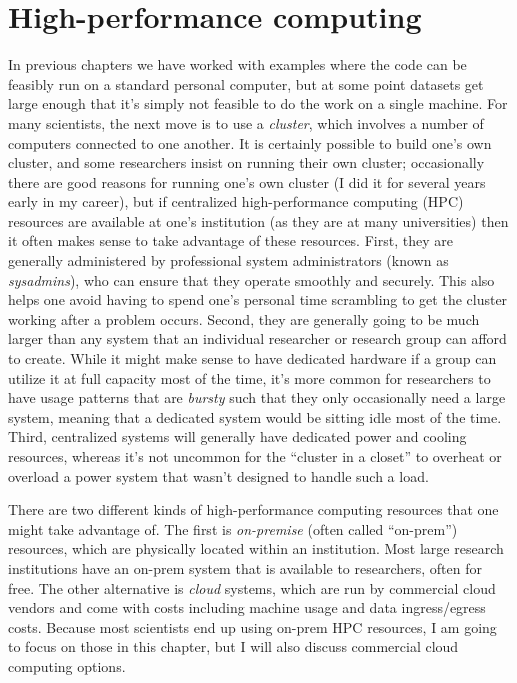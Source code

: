 \chapter{High-performance computing}

In previous chapters we have worked with examples where the code can be feasibly run on a standard personal computer, but at some point datasets get large enough that it's simply not feasible to do the work on a single machine.  For many scientists, the next move is to use a \textit{cluster}, which involves a number of computers connected to one another.  It is certainly possible to build one's own cluster, and some researchers insist on running their own cluster; occasionally there are good reasons for running one's own cluster (I did it for several years early in my career), but if centralized high-performance computing (HPC) resources are available at one's institution (as they are at many universities) then it often makes sense to take advantage of these resources. First, they are generally administered by professional system administrators (known as \textit{sysadmins}), who can ensure that they operate smoothly and securely. This also helps one avoid having to spend one's personal time scrambling to get the cluster working after a problem occurs. Second, they are generally going to be much larger than any system that an individual researcher or research group can afford to create. While it might make sense to have dedicated hardware if a group can utilize it at full capacity most of the time, it's more common for researchers to have usage patterns that are \textit{bursty} such that they only occasionally need a large system, meaning that a dedicated system would be sitting idle most of the time.  Third, centralized systems will generally have dedicated power and cooling resources, whereas it's not uncommon for the ``cluster in a closet'' to overheat or overload a power system that wasn't designed to handle such a load.

There are two different kinds of high-performance computing resources that one might take advantage of.  The first is \textit{on-premise} (often called ``on-prem'') resources, which are physically located within an institution. Most large research institutions have an on-prem system that is available to researchers, often for free. The other alternative is \textit{cloud} systems, which are run by commercial cloud vendors and come with costs including machine usage and data ingress/egress costs.  Because most scientists end up using on-prem HPC resources, I am going to focus on those in this chapter, but I will also discuss commercial cloud computing options.

